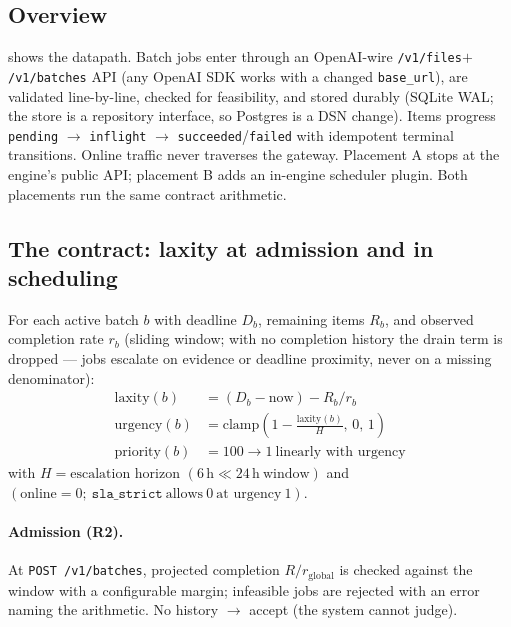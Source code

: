 \documentclass[conference]{IEEEtran}
\newcommand{\code}[1]{\texttt{#1}}
\begin{document}


\subsection{Overview}

 shows the datapath. Batch jobs enter through an OpenAI-wire
\code{/v1/files}$+$\code{/v1/batches} API (any OpenAI SDK works with a changed
\code{base\_url}), are validated line-by-line, checked for feasibility, and stored
durably (SQLite WAL; the store is a repository interface, so Postgres is a DSN change).
Items progress \code{pending} $\rightarrow$ \code{inflight} $\rightarrow$
\code{succeeded}/\code{failed} with idempotent terminal transitions. Online traffic never
traverses the gateway. Placement A stops at the engine's public API; placement B adds an
in-engine scheduler plugin. Both placements run the same contract arithmetic.

\subsection{The contract: laxity at admission and in scheduling}
\label{sec:contract}

For each active batch $b$ with deadline $D_b$, remaining items $R_b$, and observed
completion rate $r_b$ (sliding window; with no completion history the drain term is
dropped --- jobs escalate on evidence or deadline proximity, never on a missing
denominator):
\begin{align}
  \mathrm{laxity}(b)   &= (D_b - \mathrm{now}) - R_b / r_b \\
  \mathrm{urgency}(b)  &= \mathrm{clamp}\!\left(1 - \frac{\mathrm{laxity}(b)}{H},\,0,\,1\right) \\
  \mathrm{priority}(b) &= 100 \rightarrow 1 \ \text{linearly with urgency}
\end{align}
\noindent with $H = \text{escalation horizon } (6\,\mathrm{h} \ll 24\,\mathrm{h}\ \text{window})$
and $(\text{online} = 0;\ \code{sla\_strict}\ \text{allows}\ 0\ \text{at urgency}\ 1)$.

\paragraph{Admission (R2).} At \code{POST /v1/batches}, projected completion
$R/r_{\mathrm{global}}$ is checked against the window with a configurable margin;
infeasible jobs are rejected with an error naming the arithmetic. No history
$\rightarrow$ accept (the system cannot judge).
\end{document}
